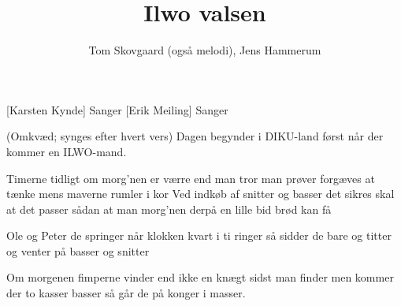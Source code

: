 \documentclass[a4paper,11pt]{article}
\title{Ilwo valsen}
\author{Tom Skovgaard (også melodi), Jens Hammerum}
\begin{document}
\maketitle

\begin{roles}
[Karsten Kynde] Sanger
[Erik Meiling] Sanger
\end{roles}

\begin{song}
(Omkvæd; synges efter hvert vers)
Dagen begynder i DIKU-land
først når der kommer en ILWO-mand.

Timerne tidligt om morg'nen
er værre end man tror
man prøver forgæves at tænke
mens maverne rumler i kor
Ved indkøb af snitter og basser
det sikres skal at det passer
sådan at man morg'nen derpå
en lille bid brød kan få

Ole og Peter de springer
når klokken kvart i ti ringer
så sidder de bare og titter
og venter på basser og snitter

Om morgenen fimperne vinder
end ikke en knægt sidst man finder
men kommer der to kasser basser
så går de på konger i masser.
\end{song}
\end{document}
